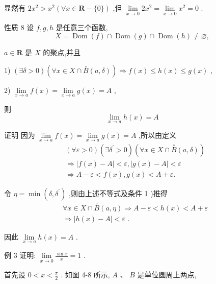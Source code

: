 显然有 $2{x}^{2} > {x}^{2}\left( {\forall x \in  \mathbf{R}-\{ 0\} }\right)$ ,但 $\mathop{\lim }\limits_{{x \rightarrow  0}}2{x}^{2} = \mathop{\lim }\limits_{{x \rightarrow  0}}{x}^{2} = 0$ .

性质 8 设 $f,g,h$ 是任意三个函数,
$$X = \operatorname{Dom}\left( f\right)  \cap  \operatorname{Dom}\left( g\right)  \cap  \operatorname{Dom}\left( h\right)  \neq  \varnothing ,$$

$a \in  \mathbf{R}$ 是 $X$ 的聚点,并且

1) $\left( {\exists \delta  > 0}\right) \left( {\forall x \in  X \cap  \overset{ \circ  }{B}\left( {a,\delta }\right) }\right)  \Rightarrow  f\left( x\right)  \leq  h\left( x\right)  \leq  g\left( x\right)$ ,

2) $\mathop{\lim }\limits_{{x \rightarrow  a}}f\left( x\right)  = \mathop{\lim }\limits_{{x \rightarrow  a}}g\left( x\right)  = A$ ,

则
$$\mathop{\lim }\limits_{{x \rightarrow  a}}h\left( x\right)  = A$$

证明 因为 $\mathop{\lim }\limits_{{x \rightarrow  a}}f\left( x\right)  = \mathop{\lim }\limits_{{x \rightarrow  a}}g\left( x\right)  = A$ ,所以由定义
\begin{align*}
	&\left( {\forall \varepsilon  > 0}\right) \left( {\exists {\delta }^{\prime } > 0}\right) \left( {\forall x \in  X \cap  \overset{ \circ  }{B}\left( {a,\delta }\right) }\right)\\
	&\Rightarrow  \left| {f\left( x\right)  - A}\right|  < \varepsilon ,\left| {g\left( x\right)  - A}\right|  < \varepsilon\\
	&\Rightarrow  A - \varepsilon  < f\left( x\right) ,g\left( x\right)  < A + \varepsilon .
\end{align*}

令 $\eta  = \min \left( {\delta ,{\delta }^{\prime }}\right)$ ,则由上述不等式及条件 1 )推得
\begin{align*}
	&\forall x \in  X \cap  \overset{ \circ  }{B}\left( {a,\eta }\right)  \Rightarrow  A - \varepsilon  < h\left( x\right)  < A + \varepsilon\\
	&\Rightarrow  \left| {h\left( x\right)  - A}\right|  < \varepsilon \text{ . }
\end{align*}

因此 $\mathop{\lim }\limits_{{x \rightarrow  a}}h\left( x\right)  = A$ .

例 3 证明: $\mathop{\lim }\limits_{{x \rightarrow  0}}\frac{\sin x}{x} = 1$ .

首先设 $0 < x < \frac{\pi }{2}$ . 如图 4-8 所示, $A\text{ 、 }B$ 是单位圆周上两点,

